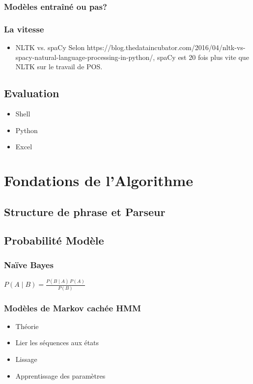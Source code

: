 \documentclass[a4paper]{article}
\begin{document}
\subsubsection{Modèles entraîné ou pas?}
\subsubsection{La vitesse}
\begin{itemize}
\item NLTK vs. spaCy \cite{noauthor_nltk_2016} Selon https://blog.thedataincubator.com/2016/04/nltk-vs-spacy-natural-language-processing-in-python/, spaCy est 20 fois plus vite que NLTK sur le travail de POS.
\end{itemize}
\subsection{Evaluation}
\begin{itemize}
\item Shell
\item Python
\item Excel
\end{itemize}

\section{Fondations de l’Algorithme}
\subsection{Structure de phrase et Parseur }
\subsection{Probabilité Modèle}
\subsubsection{Naïve Bayes}
$ P(A \mid B) = \frac{P(B \mid A) \, P(A)}{P(B)} $

\subsubsection{Modèles de Markov cachée HMM}
\begin{itemize}
\item Théorie
\item Lier les séquences aux états
\item Lissage
\item Apprentissage des paramètres
\end{itemize}
\end{document}
